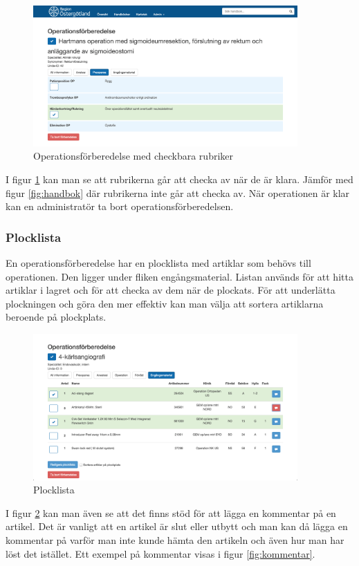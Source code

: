 \begin{figure}[H]
  \centering
  \includegraphics[width=0.9\textwidth]{images/site/op}
  \caption{Operationsförberedelse med checkbara rubriker}
  \label{fig:op}
\end{figure}

I figur \ref{fig:op} kan man se att rubrikerna går att checka av när de är klara. Jämför med figur \ref{fig:handbok} där rubrikerna inte går att checka av. När operationen är klar kan en administratör ta bort operationsförberedelsen.
\subsubsection{Plocklista}
En operationsförberedelse har en plocklista med artiklar som behövs till operationen. Den ligger under fliken engångsmaterial.
Listan används för att hitta artiklar i lagret och för att checka av dem när de plockats. För att underlätta plockningen och göra den mer effektiv kan man välja att sortera artiklarna beroende på plockplats.

\begin{figure}[H]
  \centering
  \includegraphics[width=0.9\textwidth]{images/site/plocklista}
  \caption{Plocklista}
  \label{fig:plocklista}
\end{figure}
I figur \ref{fig:plocklista} kan man även se att det finns stöd för att lägga en kommentar på en artikel.
Det är vanligt att en artikel är slut eller utbytt och man kan då lägga en kommentar på varför man inte kunde hämta den artikeln och även hur man har löst det istället. Ett exempel på kommentar visas i figur \ref{fig:kommentar}.

